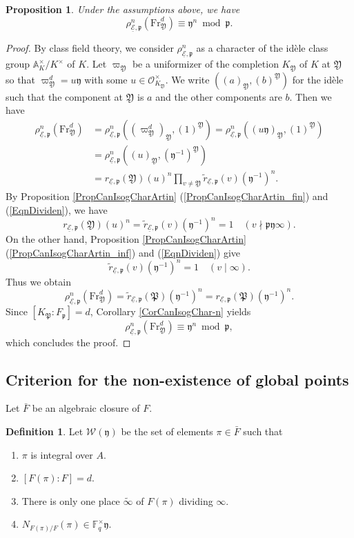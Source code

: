 \documentclass[10pt]{amsart}
\theoremstyle{plain}
\newtheorem{prop}[thm]{Proposition}
\theoremstyle{definition}
\newtheorem{dfn}[thm]{Definition}
\newcommand{\Fr}{\mathrm{Fr}}
\newcommand{\cO}{\mathcal{O}}
\newcommand{\cW}{\mathcal{W}}
\newcommand{\ucE}{\underline{\mathcal{E}}}
\newcommand{\bA}{\mathbb{A}}
\newcommand{\bF}{\mathbb{F}}
\newcommand{\frP}{\mathfrak{P}}
\newcommand{\frp}{\mathfrak{p}}
\newcommand{\frY}{\mathfrak{Y}}
\newcommand{\fry}{\mathfrak{y}}
\begin{document}
\begin{prop}\label{PropCanIsogCharFrY}
	Under the assumptions above, we have
	\[
	\rho_{\ucE,\frp}^n(\Fr_{\frY}^d)\equiv \fry^n \bmod \frp.
	\]
\end{prop}
\begin{proof}
	By class field theory, we consider $\rho_{\ucE,\frp}^n$ as a character of the id\`{e}le class group $\bA_{K}^\times/{K}^\times$ of $K$.
	Let $\varpi_{\frY}$ be a uniformizer of the completion $K_{\frY}$ of $K$ at $\frY$ so that $\varpi_{\frY}^{d}=u \fry$ with some $u\in \cO_{K_\frY}^\times$.
	We write $((a)_{\frY},(b)^{\frY})$ for the id\`{e}le such that the component at $\frY$ is $a$ and the other components are $b$.
	Then we have
	\[
	\begin{aligned}
	\rho_{\ucE,\frp}^n(\Fr^{d}_{\frY})&=\rho_{\ucE,\frp}^n((\varpi_{\frY}^{d})_{\frY},(1)^{\frY})
	=\rho_{\ucE,\frp}^n((u\fry)_{\frY},(1)^{\frY})\\
	&=\rho_{\ucE,\frp}^n((u)_{\frY},(\fry^{-1})^{\frY})\\
	&=r_{\ucE,\frp}(\frY)(u)^n\prod_{v\neq \frY}\tilde{r}_{\ucE,\frp}(v)(\fry^{-1})^n.
	\end{aligned}
	\]
	By Proposition \ref{PropCanIsogCharArtin} (\ref{PropCanIsogCharArtin_fin}) and (\ref{EqnDividen}),
	we have
	\[
	r_{\ucE,\frp}(\frY)(u)^n=\tilde{r}_{\ucE,\frp}(v)(\fry^{-1})^n=1\quad (v\nmid \frp\fry\infty).
	\]
	On the other hand, Proposition \ref{PropCanIsogCharArtin} (\ref{PropCanIsogCharArtin_inf}) and (\ref{EqnDividen})
	give
	\[
	\tilde{r}_{\ucE,\frp}(v)(\fry^{-1})^n=1\quad (v\mid\infty).
	\]
	Thus we obtain
	\[
	\rho_{\ucE,\frp}^n(\Fr^{d}_{\frY})=\tilde{r}_{\ucE,\frp}(\frP)(\fry^{-1})^n=r_{\ucE,\frp}(\frP)(\fry^{-1})^n.
	\]
	Since $[K_{\frP}:F_\frp]=d$, Corollary \ref{CorCanIsogChar-n} yields
	\[
	\rho_{\ucE,\frp}^n(\Fr^{d}_{\frY})\equiv \fry^{n}\bmod \frp,
	\]
	which concludes the proof.
\end{proof}

\subsection{Criterion for the non-existence of global points}\label{SubsecCriterionNEx}

Let $\bar{F}$ be an algebraic closure of $F$.
\begin{dfn}\label{DefWy}
	Let $\cW(\fry)$ be the set of elements $\pi\in \bar{F}$ such that
	\begin{enumerate}
		\item\label{DefWy_int} $\pi$ is integral over $A$.
		\item\label{DefWy_deg} $[F(\pi):F]=d$.
		\item\label{DefWy_pure} There is only one place $\tilde{\infty}$ of $F(\pi)$ dividing $\infty$.
		\item\label{DefWy_norm} $N_{F(\pi)/F}(\pi)\in \bF_q^\times \fry$.
	\end{enumerate}
\end{dfn}
\end{document}
